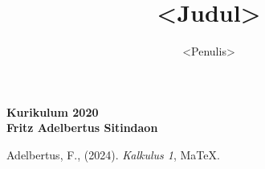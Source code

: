 \documentclass{article}
\title{<Judul>}
\author{<Penulis>}
\date{}
\begin{document}
\begin{center}
    \textbf{}

    \vspace{0.5cm}
    \textbf{\Large Kurikulum 2020}\\
    \vspace{0.5cm}
    \textbf{\Large Fritz Adelbertus Sitindaon}

    \vspace{7cm}
\end{center}
\thispagestyle{empty}

\newpage
\tableofcontents


























\begin{thebibliography}{9}
Adelbertus, F., (2024). \emph{Kalkulus 1}, MaTeX.
\end{thebibliography}
\end{document}
